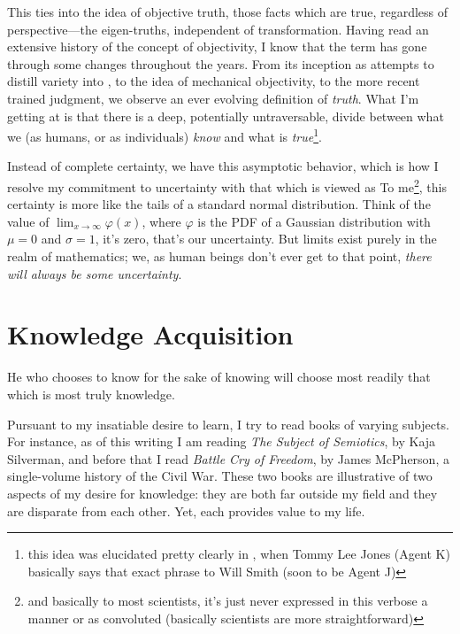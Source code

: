 \documentclass[../butidigress.tex]{subfiles}
\begin{document}
This ties into the idea of objective truth, those facts which are true, regardless of perspective---the eigen-truths, independent of transformation.
Having read an extensive history of the concept of objectivity, I know that the term has gone through some changes throughout the years\parencite{objectivity}.
From its inception as attempts to distill variety into , to the idea of mechanical objectivity, to the more recent trained judgment, we observe an ever evolving definition of \emph{truth}.
What I'm getting at is that there is a deep, potentially untraversable, divide between what we (as humans, or as individuals) \emph{know} and what is \emph{true}\footnote{this idea was elucidated pretty clearly in , when Tommy Lee Jones (Agent K) basically says that exact phrase to Will Smith (soon to be Agent J)}.

Instead of complete certainty, we have this asymptotic behavior, which is how I resolve my commitment to uncertainty with that which is viewed as 
To me\footnote{and basically to most scientists, it's just never expressed in this verbose a manner or as convoluted (basically scientists are more straightforward)}, this certainty is more like the tails of a standard normal distribution.
Think of the value of $\lim_{x\to\infty}\varphi(x)$, where $\varphi$ is the PDF of a Gaussian distribution with $\mu = 0$ and $\sigma = 1$, it's zero, that's our uncertainty.
But limits exist purely in the realm of mathematics; we, as human beings don't ever get to that point, \emph{there will always be some uncertainty}.

\section{Knowledge Acquisition}
\epigraph{He who chooses to know for the sake of knowing will choose most readily that which is most truly knowledge.}{}

Pursuant to my insatiable desire to learn, I try to read books of varying subjects.
For instance, as of this writing I am reading \textit{The Subject of Semiotics}, by Kaja Silverman, and before that I read \textit{Battle Cry of Freedom}, by James McPherson, a single-volume history of the Civil War.
These two books are illustrative of two aspects of my desire for knowledge: they are both far outside my field and they are disparate from each other.
Yet, each provides value to my life.
\end{document}
